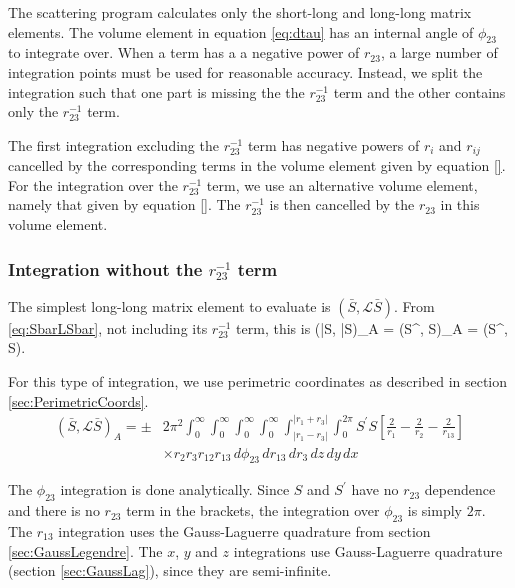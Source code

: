 \documentclass[Dissertation.tex]{subfiles}
\begin{document}
The scattering program calculates only the short-long and long-long matrix 
elements. The volume element in equation \ref{eq:dtau} has an internal angle 
of $\phi_{23}$ to integrate over.  When a term has a a negative power of
$r_{23}$, a large number of integration points must be used for reasonable 
accuracy. Instead, we split the integration such that one part is missing the 
the $r_{23}^{-1}$ term and the other contains only the $r_{23}^{-1}$ term.

The first integration excluding the $r_{23}^{-1}$ term has negative powers of 
$r_i$ and $r_{ij}$ cancelled by the corresponding terms in the volume element 
given by equation \ref{}.  For the integration over the $r_{23}^{-1}$ term, 
we use an alternative volume element, namely that given by equation \ref{}.  
The $r_{23}^{-1}$ is then cancelled by the $r_{23}$ in this volume element.


\subsubsection{Integration without the \texorpdfstring{$r_{23}^{-1}$} {1/r23} term}
\label{sec:LongLongNoR23}
The simplest long-long matrix element to evaluate is $(\bar{S},\mathcal{L} \bar{S})$.  From \cref{eq:SbarLSbar}, not including its $r_{23}^{-1}$ term, this is
\beq
(\bar{S}, \bar{S})_A = \pm \left(S^\prime, S\right)_A = \pm \left(S^\prime,  S\right).
\eeq

For this type of integration, we use perimetric coordinates as described in section \ref{sec:PerimetricCoords}.
\begin{align}
\label{eq:SBarSBarInt}
(\bar{S},\mathcal{L} \bar{S})_A = \pm &2\pi^2 \int_0^\infty \int_0^\infty \int_0^\infty \int_0^\infty \int_{|r_1 - r_3|}^{|r_1 + r_3|} \int_0^{2\pi}  S^\prime S \left[ \frac{2}{r_1} - \frac{2}{r_2} - \frac{2}{r_{13}}\right] \\
&\times r_2 r_3 r_{12} r_{13}\, d\phi_{23}\, dr_{13}\, dr_3\, dz\, dy\, dx
\end{align}

The $\phi_{23}$ integration is done analytically. Since $S$ and $S^\prime$ have no $r_{23}$ dependence and there is no $r_{23}$ term in the brackets, the integration over $\phi_{23}$ is simply $2\pi$.  The $r_{13}$ integration uses the Gauss-Laguerre quadrature from section \ref{sec:GaussLegendre}. The $x$, $y$ and $z$ integrations use Gauss-Laguerre quadrature (section \ref{sec:GaussLag}), since they are semi-infinite.
\end{document}
